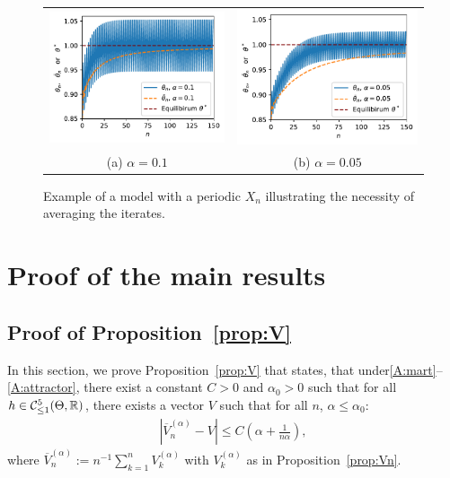 \documentclass{article}
\newcommand{\R}{\mathbb{R}}
\newcommand\abs[1]{\left|#1\right|}
\newcommand\toA{^{(\alpha)}}
\newcommand\cont[3][]{\mathcal{C}^{#2}_{\ifthenelse{\equal{#1}{all}}{}{\le1}}(#3,\R)}
\begin{document}
\begin{figure}[ht]
    \centering
    \begin{tabular}{@{}c@{}c@{}}
        \includegraphics[width=0.45\linewidth]{stoch_approx_periodic_example_100.pdf}
        &\includegraphics[width=0.45\linewidth]{stoch_approx_periodic_example_50.pdf}\\
        (a) $\alpha=0.1$ & (b) $\alpha=0.05$
    \end{tabular}
    \caption{Example of a model with a periodic $X_n$ illustrating the necessity of averaging the iterates. }
    \label{fig:example_periodic_y}
\end{figure}



\section{Proof of the main results}
\label{apx:proof_theorems}

\subsection{Proof of Proposition~\ref{prop:V}}
\label{ssec:proof_prop:V}

In this section, we prove Proposition~\ref{prop:V} that states, that under\ref{A:mart}--\ref{A:attractor}, there exist a constant $C>0$ and $\alpha_0>0$ such that for all $h\in\cont{5}{\Theta}$, there exists a vector $V$ such that for all $n$, $\alpha\le\alpha_0$:
\begin{align*}
    \abs{\overline{V}\toA_n - V} \le C(\alpha + \frac1{n\alpha}),
\end{align*}
where $\overline{V}\toA_n := n^{-1}\sum_{k=1}^{n}V\toA_k$ with $V\toA_k$ as in Proposition~\ref{prop:Vn}.
\end{document}
